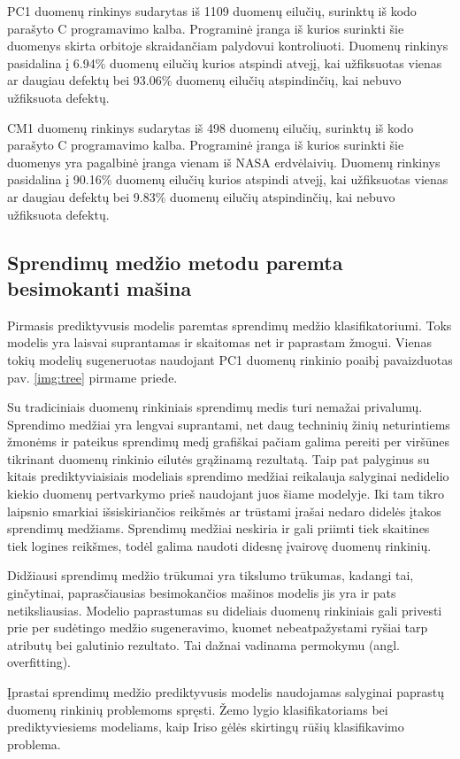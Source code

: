 \documentclass{VUMIFPSbakalaurinis}
\begin{document}
PC1 duomenų rinkinys sudarytas iš 1109 duomenų eilučių, surinktų iš kodo parašyto C programavimo kalba. Programinė įranga iš kurios surinkti šie duomenys skirta orbitoje skraidančiam palydovui kontroliuoti. Duomenų rinkinys pasidalina į 6.94\% duomenų eilučių kurios atspindi atvejį, kai užfiksuotas vienas ar daugiau defektų bei 93.06\% duomenų eilučių atspindinčių, kai nebuvo užfiksuota defektų.

CM1 duomenų rinkinys sudarytas iš 498 duomenų eilučių, surinktų iš kodo parašyto C programavimo kalba. Programinė įranga iš kurios surinkti šie duomenys yra pagalbinė įranga vienam iš NASA erdvėlaivių. Duomenų rinkinys pasidalina į 90.16\% duomenų eilučių kurios atspindi atvejį, kai užfiksuotas vienas ar daugiau defektų bei 9.83\% duomenų eilučių atspindinčių, kai nebuvo užfiksuota defektų.

\subsection{Sprendimų medžio metodu paremta besimokanti mašina}
Pirmasis prediktyvusis modelis paremtas sprendimų medžio klasifikatoriumi. Toks modelis yra laisvai suprantamas ir skaitomas net ir paprastam žmogui. Vienas tokių modelių sugeneruotas naudojant PC1 duomenų rinkinio poaibį pavaizduotas pav. \ref{img:tree} pirmame priede. 

Su tradiciniais duomenų rinkiniais sprendimų medis turi nemažai privalumų. Sprendimo medžiai yra lengvai suprantami, net daug techninių žinių neturintiems žmonėms ir pateikus sprendimų medį grafiškai pačiam galima pereiti per viršūnes tikrinant duomenų rinkinio eilutės grąžinamą rezultatą. Taip pat palyginus su kitais prediktyviaisiais modeliais sprendimo medžiai reikalauja salyginai nedidelio kiekio duomenų pertvarkymo prieš naudojant juos šiame modelyje. Iki tam tikro laipsnio smarkiai išsiskiriančios reikšmės ar trūstami įrašai nedaro didelės įtakos sprendimų medžiams. Sprendimų medžiai neskiria ir gali priimti tiek skaitines tiek logines reikšmes, todėl galima naudoti didesnę įvairovę duomenų rinkinių.

Didžiausi sprendimų medžio trūkumai yra tikslumo trūkumas, kadangi tai, ginčytinai, paprasčiausias besimokančios mašinos modelis jis yra ir pats netiksliausias. Modelio paprastumas su dideliais duomenų rinkiniais gali privesti prie per sudėtingo medžio sugeneravimo, kuomet nebeatpažystami ryšiai tarp atributų bei galutinio rezultato. Tai dažnai vadinama permokymu (angl. overfitting).

Įprastai sprendimų medžio prediktyvusis modelis naudojamas salyginai paprastų duomenų rinkinių problemoms spręsti. Žemo lygio klasifikatoriams bei prediktyviesiems modeliams, kaip Iriso gėlės skirtingų rūšių klasifikavimo problema.
\end{document}
